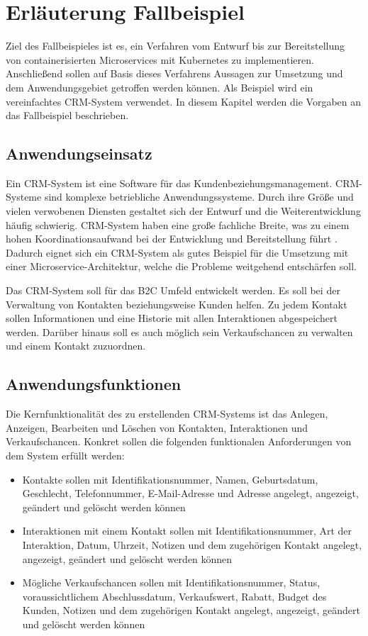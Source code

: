 \section{Erläuterung Fallbeispiel}
Ziel des Fallbeispieles ist es, ein Verfahren vom Entwurf bis zur Bereitstellung von containerisierten Microservices mit Kubernetes zu implementieren. Anschließend sollen auf Basis dieses Verfahrens Aussagen zur Umsetzung und dem Anwendungsgebiet getroffen werden können. Als Beispiel wird ein vereinfachtes \ac{CRM}-System verwendet. In diesem Kapitel werden die Vorgaben an das Fallbeispiel beschrieben.

\subsection{Anwendungseinsatz}
Ein \ac{CRM}-System ist eine Software für das Kundenbeziehungsmanagement. CRM-Systeme sind komplexe betriebliche Anwendungssysteme. Durch ihre Größe und vielen verwobenen Diensten gestaltet sich der Entwurf und die Weiterentwicklung häufig schwierig. \ac{CRM}-System haben eine große fachliche Breite, was zu einem hohen Koordinationsaufwand bei der Entwicklung und Bereitstellung führt \parencite[vgl.][S. 62]{trempArchitekturen2021}. Dadurch eignet sich ein \ac{CRM}-System als gutes Beispiel für die Umsetzung mit einer Microservice-Architektur, welche die Probleme weitgehend entschärfen soll. 

Das \ac{CRM}-System soll für das \ac{B2C} Umfeld entwickelt werden. Es soll bei der Verwaltung von Kontakten beziehungsweise Kunden helfen. Zu jedem Kontakt sollen Informationen und eine Historie mit allen Interaktionen abgespeichert werden. Darüber hinaus soll es auch möglich sein Verkaufschancen zu verwalten und einem Kontakt zuzuordnen.

\subsection{Anwendungsfunktionen}
Die Kernfunktionalität des zu erstellenden \ac{CRM}-Systems ist das Anlegen, Anzeigen, Bearbeiten und Löschen von Kontakten, Interaktionen und Verkaufschancen. Konkret sollen die folgenden funktionalen Anforderungen von dem System erfüllt werden:
\begin{itemize}
\item Kontakte sollen mit Identifikationsnummer, Namen, Geburtsdatum, Geschlecht, Telefonnummer, E-Mail-Adresse und Adresse angelegt, angezeigt, geändert und gelöscht werden können
\item Interaktionen mit einem Kontakt sollen mit Identifikationsnummer, Art der Interaktion, Datum, Uhrzeit, Notizen und dem zugehörigen Kontakt angelegt, angezeigt, geändert und gelöscht werden können
\item Mögliche Verkaufschancen sollen mit Identifikationsnummer, Status, voraussichtlichem Abschlussdatum, Verkaufswert, Rabatt, Budget des Kunden, Notizen und dem zugehörigen Kontakt angelegt, angezeigt, geändert und gelöscht werden können
\end{itemize} 

